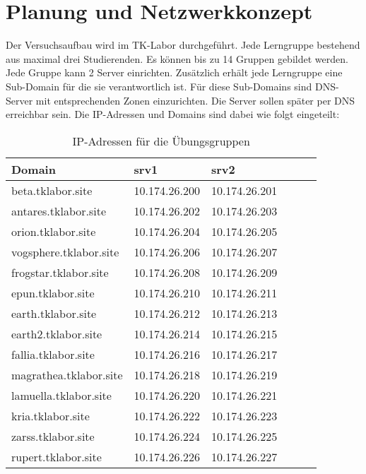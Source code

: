 \section{Planung und Netzwerkkonzept}
Der Versuchsaufbau wird im TK-Labor durchgeführt. Jede Lerngruppe
bestehend aus maximal drei Studierenden. Es können bis zu 14 Gruppen gebildet
werden. Jede Gruppe kann 2 Server einrichten. Zusätzlich erhält jede Lerngruppe
eine Sub-Domain für die sie verantwortlich ist. Für diese Sub-Domains sind DNS-Server mit entsprechenden
Zonen einzurichten. Die Server sollen später per DNS erreichbar sein. Die
IP-Adressen und Domains sind dabei wie folgt eingeteilt:

\begin{table}[!h]
  \centering
  \begin{tabular}{l l l l l l}
	\hline
	\textbf{Domain} & \textbf{srv1} & \textbf{srv2} \\
	\hline
	beta.tklabor.site & 10.174.26.200 & 10.174.26.201 \\
	antares.tklabor.site & 10.174.26.202 & 10.174.26.203 \\
	\hline
	orion.tklabor.site & 10.174.26.204 & 10.174.26.205 \\
	vogsphere.tklabor.site & 10.174.26.206 & 10.174.26.207 \\
	\hline
	frogstar.tklabor.site & 10.174.26.208 & 10.174.26.209 \\
	epun.tklabor.site & 10.174.26.210 & 10.174.26.211 \\
	\hline
	earth.tklabor.site & 10.174.26.212 & 10.174.26.213 \\
	earth2.tklabor.site & 10.174.26.214 & 10.174.26.215 \\
	\hline
	fallia.tklabor.site & 10.174.26.216 & 10.174.26.217 \\
	magrathea.tklabor.site & 10.174.26.218 & 10.174.26.219 \\
	\hline
	lamuella.tklabor.site & 10.174.26.220 & 10.174.26.221 \\
	kria.tklabor.site & 10.174.26.222 & 10.174.26.223 \\
	\hline
	zarss.tklabor.site & 10.174.26.224 & 10.174.26.225 \\
	rupert.tklabor.site & 10.174.26.226 & 10.174.26.227 \\
	\end{tabular}
	\caption{IP-Adressen für die Übungsgruppen}
	\label{tab:chap-labdocu-ipadressplan}
\end{table}

